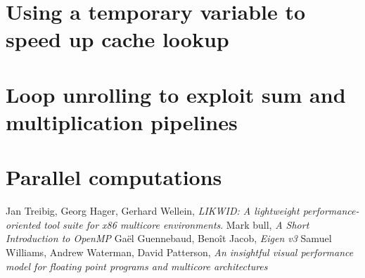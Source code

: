 \documentclass[11pt,a4paper,oneside,titlepage,openright]{book}
\begin{document}
\chapter{Using a temporary variable to speed up cache lookup}

\chapter{Loop unrolling to exploit sum and multiplication pipelines}

\chapter{Parallel computations}

\begin{thebibliography}{1}
Jan Treibig, Georg Hager, Gerhard Wellein, \textit{LIKWID: A lightweight performance-oriented tool suite for x86 multicore environments}. 
Mark bull, \textit{A Short Introduction to OpenMP}
Ga\"{e}l Guennebaud, Beno\^{i}t Jacob, \textit{Eigen v3}
Samuel Williams, Andrew Waterman, David Patterson, \textit{An insightful visual performance model for floating point programs and multicore architectures}
\end{thebibliography}
 
 
 
 
 
\end{document}
